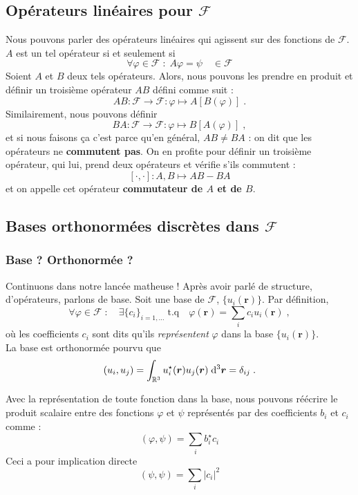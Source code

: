 \documentclass[../notesdecours.tex]{subfiles}
\begin{document}
\subsection{Opérateurs linéaires pour $\mathcal F$}
Nous pouvons parler des opérateurs linéaires qui agissent sur des fonctions de $\mathcal F$. $A$ est un tel opérateur si et seulement si $$\forall \varphi \in \mathcal F \; : \; A\varphi = \psi \quad \in 
\mathcal F$$
Soient $A$ et $B$ deux tels opérateurs. Alors, nous pouvons les prendre en produit et définir un troisième opérateur $AB$ défini comme suit :
$$AB : \mathcal F \rightarrow \mathcal F : \varphi \longmapsto A[B(\varphi)]\; .$$
Similairement, nous pouvons définir
$$BA : \mathcal F \rightarrow \mathcal F : \varphi \longmapsto B[A(\varphi)]\; ,$$
et si nous faisons ça c'est parce qu'en général, $AB \neq BA$ : on dit que les opérateurs ne \textbf{commutent pas}. On en profite pour définir un troisième opérateur, qui lui, prend deux opérateurs et vérifie s'ils commutent :
$$[\cdot, \cdot] : A, B \longmapsto AB-BA$$
et on appelle cet opérateur \textbf{commutateur de $A$ et de $B$}.

\subsection{Bases orthonormées discrètes dans $\mathcal F$}
\subsubsection{Base ? Orthonormée ?}
Continuons dans notre lancée matheuse ! Après avoir parlé de structure, d'opérateurs, parlons de base. Soit une base de $\mathcal F$, $\{u_i(\bm{r})\}$. Par définition, 
\begin{equation}
\label{eq:base_orthonormee_F}
\forall \varphi \in \mathcal F \; : \quad \exists \{c_i\}_{i=1, ...} \; \mathrm{t.q} \quad \varphi(\bm{r}) = \sum_i c_i u_i(\bm{r}) \; ,
\end{equation}
où les coefficients $c_i$ sont dits qu'ils \textit{représentent} $\varphi$ dans la base $\{u_i(\bm{r})\}$.\\

La base est orthonormée pourvu que 
\begin{equation}
\label{eq:orthonorm_F}
(u_i, u_j) = \int_{\mathbb R ^3} u_i ^\star(\bm{r}) u_j(\bm{r}) \; \mathrm{d} ^3 \bm{r} = \delta_{ij} \; .
\end{equation}

Avec la représentation de toute fonction dans la base, nous pouvons réécrire le produit scalaire entre des fonctions $\varphi$ et $\psi$ représentés par des coefficients $b_i$ et $c_i$ comme :
$$(\varphi, \psi) = \sum_i b_i ^\star c_i$$
Ceci a pour implication directe 
\begin{equation}
\label{eq:base_orthonormee_coeffsci}
(\psi, \psi) = \sum_i |c_i|^2
\end{equation}
\end{document}

